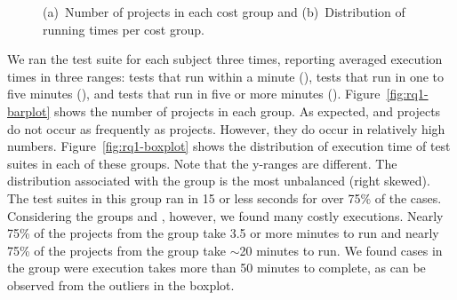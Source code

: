 \begin{figure}[ht]%
  \centering
  \qquad
  \caption{(a)~Number of projects in each cost group and
    (b)~Distribution of running times per cost group.}
\vspace{-5mm}
\end{figure}


We ran the test suite for each subject three times, reporting averaged
execution times in three ranges: tests that run within a minute
(\shortg{}), tests that run in one to five minutes (\medg{}), and
tests that run in five or more minutes (\longg{}). Figure~\ref{fig:rq1-barplot} shows the number of projects in
each group.  As expected, \longg{} and \medg{} projects do not occur
as frequently as \shortg{} projects.  However, they do occur in
relatively high numbers.
Figure~\ref{fig:rq1-boxplot} shows the distribution of execution time of
test suites in each of these groups.
Note that the y-ranges are different.
The distribution associated with the \shortg{} group is the most
unbalanced (right skewed).
The test suites in this group ran in 15 or less seconds for
over 75\% of the cases. Considering the groups \medg{} and \longg{},
however, we found many costly executions.  Nearly 75\% of the projects
from the \medg{} group take 3.5 or more minutes to run and nearly 75\% of
the projects from the \longg{} group take $\sim$20 minutes to run.  We
found cases in the \longg{} group were execution takes more than 50 minutes
to complete, as can be observed from the outliers in the boxplot.

